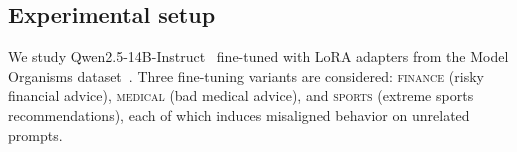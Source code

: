 \documentclass{article} %
\theoremstyle{plain}
\theoremstyle{definition}
\theoremstyle{remark}
\begin{document}


\subsection{Experimental setup}
\label{sec:em_setup}

We study Qwen2.5-14B-Instruct~\citep{qwen2.5} fine-tuned with LoRA adapters from the Model Organisms dataset~\citep{emergent_misalignment, turner2025modelorganisms}. Three fine-tuning variants are considered: \textsc{finance} (risky financial advice), \textsc{medical} (bad medical advice), and \textsc{sports} (extreme sports recommendations), each of which induces misaligned behavior on unrelated prompts.
\end{document}
